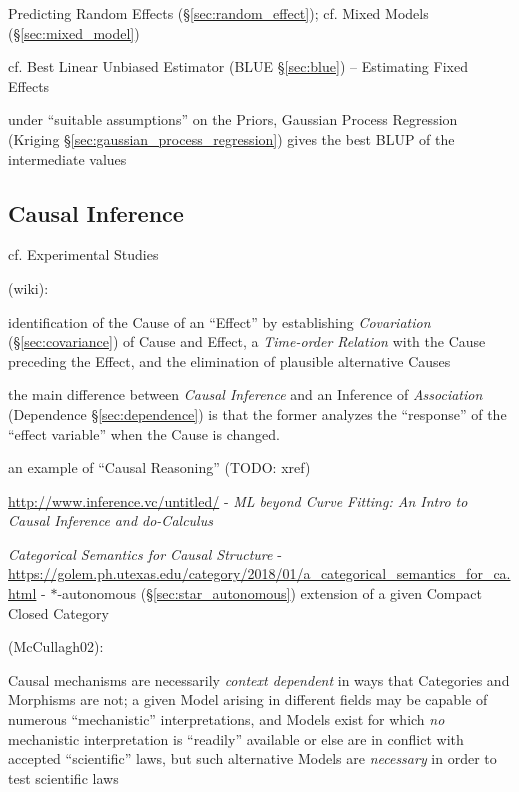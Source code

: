 Predicting Random Effects (\S\ref{sec:random_effect});
cf. Mixed Models (\S\ref{sec:mixed_model})

cf. Best Linear Unbiased Estimator (BLUE \S\ref{sec:blue}) -- Estimating
Fixed Effects

under ``suitable assumptions'' on the Priors, Gaussian Process Regression
(Kriging \S\ref{sec:gaussian_process_regression}) gives the best BLUP of the
intermediate values



\subsection{Causal Inference}\label{sec:causal_inference}

cf. Experimental Studies

(wiki):

identification of the Cause of an ``Effect'' by establishing \emph{Covariation}
(\S\ref{sec:covariance}) of Cause and Effect, a \emph{Time-order Relation} with
the Cause preceding the Effect, and the elimination of plausible alternative
Causes

the main difference between \emph{Causal Inference} and an Inference of
\emph{Association} (Dependence \S\ref{sec:dependence}) is that the former
analyzes the ``response'' of the ``effect variable'' when the Cause is changed.

an example of ``Causal Reasoning'' (TODO: xref)

\url{http://www.inference.vc/untitled/} - \emph{ML beyond Curve Fitting: An
  Intro to Causal Inference and do-Calculus}

\emph{Categorical Semantics for Causal Structure} -
\url{https://golem.ph.utexas.edu/category/2018/01/a_categorical_semantics_for_ca.html}
- $*$-autonomous (\S\ref{sec:star_autonomous}) extension of a given Compact
Closed Category

(McCullagh02):

Causal mechanisms are necessarily \emph{context dependent} in ways that
Categories and Morphisms are not;
a given Model arising in different fields may be capable of numerous
``mechanistic'' interpretations, and Models exist for which \emph{no}
mechanistic interpretation is ``readily'' available or else are in conflict
with accepted ``scientific'' laws, but such alternative Models are
\emph{necessary} in order to test scientific laws


